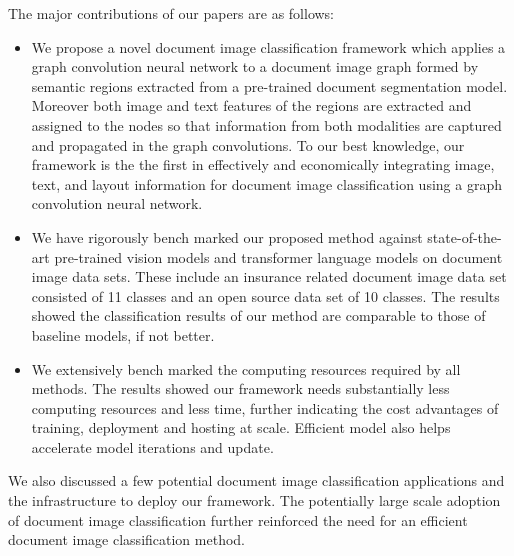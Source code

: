\documentclass[letterpaper]{article}
\begin{document}
The major contributions of our papers are as follows:
\begin{itemize}
    \item We propose a novel document image classification framework which applies a graph convolution neural network to a document image graph formed by semantic regions extracted from a pre-trained document segmentation model. Moreover both image and text features of the regions are extracted and assigned to the nodes so that information from both modalities are captured and propagated in the graph convolutions. To our best knowledge, our framework is the the first in effectively and economically integrating image, text, and layout information for document image classification using a graph convolution neural network.
    \item We have rigorously bench marked our proposed method against state-of-the-art pre-trained vision models and transformer language models on document image data sets. These include an insurance related document image data set consisted of 11 classes and an open source data set of 10 classes. The results showed the classification results of our method are comparable to those of baseline models, if not better. 
    \item We  extensively bench marked the computing resources required by all methods. The results showed our framework needs substantially less computing resources and less time, further indicating the cost advantages of training, deployment and hosting at scale. Efficient model also helps accelerate model iterations and update.   \end{itemize}
We also discussed a few potential document image classification applications and the infrastructure to deploy our framework. The potentially large scale adoption of document image classification further reinforced the need for an efficient document image classification method.  
\end{document}
